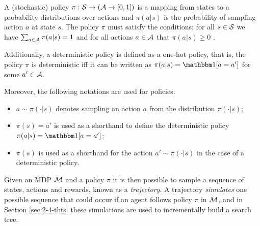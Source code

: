     \begin{defn}
        \label{def:2:policy}
        A \textnormal{(stochastic) policy} $\pi:\mathcal{S}\rightarrow (\mathcal{A} \rightarrow [0,1])$ is a mapping from states to a probability distributions over actions and $\pi(a|s)$ is the probability of sampling action $a$ at state $s$. The policy $\pi$ must satisfy the conditions: for all $s \in \mathcal{S}$ we have $\sum_{a\in\mathcal{A}} \pi(a|s) = 1$ and for all actions $a\in\mathcal{A}$ that $\pi(a|s)\geq 0$ . 
        
        Additionally, a \textnormal{deterministic policy} is defined as a one-hot policy, that is, the policy $\pi$ is deterministic iff it can be written as $\pi(a|s)=\one[a=a']$ for some $a'\in\mathcal{A}$.

        Moreover, the following notations are used for policies:
        \begin{itemize}
            \item $a\sim\pi(\cdot|s)$ denotes sampling an action $a$ from the distribution $\pi(\cdot|s)$;
            \item $\pi(s)=a'$ is used as a shorthand to define the deterministic policy $\pi(a|s)=\one[a=a']$; 
            \item $\pi(s)$ is used as a shorthand for the action $a'\sim\pi(\cdot|s)$ in the case of a deterministic policy.
        \end{itemize}
    \end{defn}
    
    Given an MDP $\mathcal{M}$ and a policy $\pi$ it is then possible to sample a sequence of states, actions and rewards, known as a \textit{trajectory}. A trajectory \textit{simulates} one possible sequence that could occur if an agent follows policy $\pi$ in $\mathcal{M}$, and in Section \ref{sec:2-4-thts} these simulations are used to incrementally build a search tree.
    
